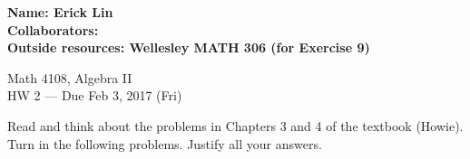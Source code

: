 \documentclass[12pt]{article}
\begin{document}
\noindent
\textbf{Name: Erick Lin} \smallskip  \\
\textbf{Collaborators:} \smallskip \\ %
\textbf{Outside resources: Wellesley MATH 306 (for Exercise 9)} \smallskip \\ %

\begin{center}
{
Math 4108, Algebra II \\
HW 2 --- Due Feb 3, 2017 (Fri)
}
\end{center}

\noindent Read and think about the problems in Chapters 3 and 4 of the textbook (Howie).   Turn in the following problems.  Justify all your answers.
\end{document}
